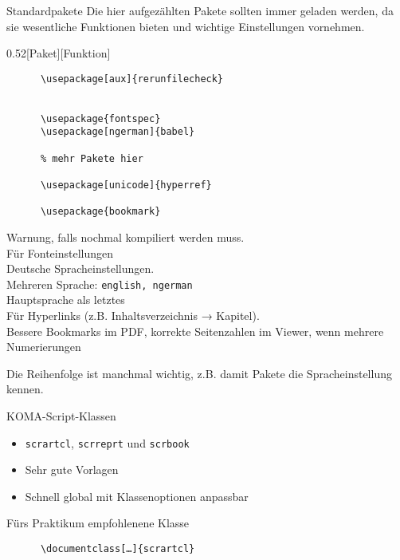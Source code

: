 \begin{frame}[fragile]{Standardpakete}
  Die hier aufgezählten Pakete sollten immer geladen werden, da sie wesentliche Funktionen bieten und wichtige Einstellungen vornehmen.
  \vspace{-1em}
  \begin{CodeExplanation}{0.52}[Paket][Funktion]
    \begin{lstlisting}
      \usepackage[aux]{rerunfilecheck}


      \usepackage{fontspec}
      \usepackage[ngerman]{babel}

      % mehr Pakete hier

      \usepackage[unicode]{hyperref}

      \usepackage{bookmark}
    \end{lstlisting}
  \Explanation
    Warnung, falls nochmal kompiliert werden muss. \\[\baselineskip]
    Für Fonteinstellungen \\
    Deutsche Spracheinstellungen. \\
    Mehreren Sprache: \texttt{english, ngerman} \\
    Hauptsprache als letztes \\[\baselineskip]
    Für Hyperlinks (z.B. Inhaltsverzeichnis → Kapitel). \\
    Bessere Bookmarks im PDF,
    korrekte Seitenzahlen im Viewer, wenn mehrere Numerierungen
  \end{CodeExplanation}
  Die Reihenfolge ist manchmal wichtig, z.B. damit Pakete die Spracheinstellung kennen.
\end{frame}

\begin{frame}[fragile]{
  KOMA-Script-Klassen
  \hfill
}
  \begin{itemize}
    \item \texttt{scrartcl}, \texttt{scrreprt} und \texttt{scrbook}
    \item Sehr gute Vorlagen
    \item Schnell global mit Klassenoptionen anpassbar
  \end{itemize}
  \begin{block}{Fürs Praktikum empfohlenene Klasse}
    \begin{lstlisting}
      \documentclass[…]{scrartcl}
    \end{lstlisting}
  \end{block}
\end{frame}

